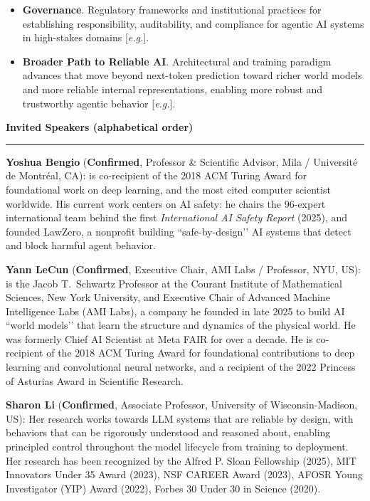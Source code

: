 \documentclass{article}
\newcommand{\confirmed}{\textcolor{green!60!black}{\textbf{Confirmed}}}
\newcommand{\eg}{\textit{e.g.}}
\newcommand{\sectiontitle}[1]{\noindent\textbf{\textcolor{neuripsblue}{#1}}\vspace{0.1cm}\hrule\vspace{0.2cm}}
\begin{document}
\begin{itemize}[leftmargin=10pt,itemsep=1pt,topsep=2pt]
\begin{itemize}[itemsep=1pt,topsep=0pt]
\item \textit{Testing, Debugging, and Evaluation}. Dynamic testing, fault localization, and systematic evaluation of agentic AI systems under real-world deployment conditions [\eg \cite{jimenez2024swebench, xia2025agentless, xia2023automated}].
\end{itemize}
\item \textbf{Governance}. Regulatory frameworks and institutional practices for establishing responsibility, auditability, and compliance for agentic AI systems in high-stakes domains [\eg \cite{mitchell2019model, bender2021stochastic}].
\item \textbf{Broader Path to Reliable AI}. Architectural and training paradigm advances that move beyond next-token prediction toward richer world models and more reliable internal representations, enabling more robust and trustworthy agentic behavior [\eg \cite{huang2026llmjepa}].
\end{itemize}


\sectiontitle{Invited Speakers (alphabetical order)}
\vspace{-2pt}
 \textbf{Yoshua Bengio} (\confirmed, Professor \& Scientific Advisor, Mila / Université de Montréal, CA): is co-recipient of the 2018 ACM Turing Award for foundational work on deep learning, and the most cited computer scientist worldwide. His current work centers on AI safety: he chairs the 96-expert international team behind the first \textit{International AI Safety Report} (2025), and founded LawZero, a nonprofit building ``safe-by-design’’ AI systems that detect and block harmful agent behavior.

\textbf{Yann LeCun} (\confirmed, Executive Chair, AMI Labs / Professor, NYU, US): is the Jacob T.~Schwartz Professor at the Courant Institute of Mathematical Sciences, New York University, and Executive Chair of Advanced Machine Intelligence Labs (AMI Labs), a company he founded in late 2025 to build AI ``world models’’ that learn the structure and dynamics of the physical world. He was formerly Chief AI Scientist at Meta FAIR for over a decade. He is co-recipient of the 2018 ACM Turing Award for foundational contributions to deep learning and convolutional neural networks, and a recipient of the 2022 Princess of Asturias Award in Scientific Research.
     
\textbf{Sharon Li} (\confirmed, Associate Professor, University of Wisconsin-Madison, US): Her research works towards LLM systems that are reliable by design, with behaviors that can be rigorously understood and reasoned about, enabling principled control throughout the model lifecycle from training to deployment. Her research has been recognized by the Alfred P. Sloan Fellowship (2025), MIT Innovators Under 35 Award (2023), NSF CAREER Award (2023), AFOSR Young Investigator (YIP) Award (2022), Forbes 30 Under 30 in Science (2020).
\end{document}
